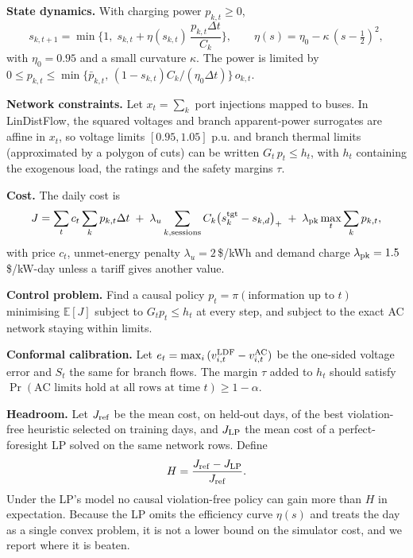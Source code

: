 \documentclass[11pt]{article}
\begin{document}
\textbf{State dynamics.} With charging power $p_{k,t}\ge0$,
\begin{equation}
s_{k,t+1}=\min\!\Big\{1,\; s_{k,t}+\eta(s_{k,t})\,\frac{p_{k,t}\Delta t}{C_k}\Big\},\qquad \eta(s)=\eta_0-\kappa\,(s-\tfrac12)^2,
\end{equation}
with $\eta_0=0.95$ and a small curvature $\kappa$. The power is limited by $0\le p_{k,t}\le \min\{\bar p_{k,t},\,(1-s_{k,t})C_k/(\eta_0\Delta t)\}\,o_{k,t}$.

\textbf{Network constraints.} Let $x_t=\sum_k$ port injections mapped to buses. In LinDistFlow, the squared voltages and branch apparent-power surrogates are affine in $x_t$, so voltage limits $[0.95,1.05]$ p.u. and branch thermal limits (approximated by a polygon of cuts) can be written $G_t\,p_t\le h_t$, with $h_t$ containing the exogenous load, the ratings and the safety margins $\tau$.

\textbf{Cost.} The daily cost is
\begin{equation}
J=\sum_{t}c_t\sum_k p_{k,t}\Delta t\;+\;\lambda_u\sum_{k,\text{sessions}}C_k\big(s^{\rm tgt}_k-s_{k,d}\big)_+\;+\;\lambda_{\rm pk}\max_t\sum_k p_{k,t},
\end{equation}
with price $c_t$, unmet-energy penalty $\lambda_u=2$\,\$/kWh and demand charge $\lambda_{\rm pk}=1.5$\,\$/kW-day unless a tariff gives another value.

\textbf{Control problem.} Find a causal policy $p_t=\pi(\text{information up to }t)$ minimising $\mathbb E[J]$ subject to $G_tp_t\le h_t$ at every step, and subject to the exact AC network staying within limits.

\textbf{Conformal calibration.} Let $e_t=\max_i\,(v^{\rm LDF}_{i,t}-v^{\rm AC}_{i,t})$ be the one-sided voltage error and $S_t$ the same for branch flows. The margin $\tau$ added to $h_t$ should satisfy $\Pr(\text{AC limits hold at all rows at time }t)\ge1-\alpha$.

\textbf{Headroom.} Let $J_{\rm ref}$ be the mean cost, on held-out days, of the best violation-free heuristic selected on training days, and $J_{\rm LP}$ the mean cost of a perfect-foresight LP solved on the same network rows. Define
\begin{equation}
H=\frac{J_{\rm ref}-J_{\rm LP}}{J_{\rm ref}}.
\end{equation}
Under the LP's model no causal violation-free policy can gain more than $H$ in expectation. Because the LP omits the efficiency curve $\eta(s)$ and treats the day as a single convex problem, it is not a lower bound on the simulator cost, and we report where it is beaten.
\end{document}
